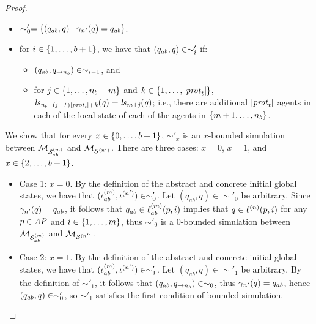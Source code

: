 \documentclass{article}
\begin{document}
\begin{proof}
\begin{itemize}

    \item  $\sim'_0 = \left \{ (q_{ab}, q) \mid  \gamma_{n'}(q) = q_{ab} \right \}$.


  \item for $i \in \left \{ 1, \ldots, b + 1 \right \}$, we have that $(q_{ab}, q) \in
  \sim'_i$ if:
  \begin{itemize}
    \item  $(q_{ab},q_{\rightarrow n_b}) \in \sim_{i-1}$, and 
    \item  for $j \in \left \{ 1,\ldots,n_b - m \right \}$ and $k \in \left \{ 1,\ldots,|\mathit{prot}_{t}| \right \}$, 
    $\it{ls}_{n_b + (j - 1) |\mathit{prot}_{t}| + k}(q) = \it{ls}_{m+j}(q)$; i.e., there are
          additional $|\mathit{prot}_{t}|$  agents in each of the local state of each of
          the agents in $\left \{ m+1,\ldots,n_b \right \}$.
  \end{itemize}
\end{itemize}

We show that for every $x \in \left \{ 0, \ldots, b+1 \right \}$, $\sim'_x$ is an
$x$-bounded simulation between $\mathcal{M}_{\mathcal{S}_{ab}^{(m)}}$ and $\mathcal{M}_{\mathcal{S}^{(n')}}$. There are three
cases: $x=0$, $x=1$, and $x \in \left \{ 2,\ldots,b+1 \right \}$.
    
\begin{itemize}
  \item Case 1: $x=0$. By the definition of the abstract and concrete initial
      global states, we have that $(\iota^{({m})}_{ab}, \iota^{({n'})}) \in
        \sim'_0$. Let $(q_{ab}, q) \in \sim'_0$ be arbitrary. Since
        $\gamma_{n'}(q) = q_{ab}$, it follows that $q_{ab} \in \ell^{(m)}_{ab}(p,
        i)$ implies that $q \in \ell^{(n)} (p, i)$ for any $p \in \it{AP}$
        and $i \in \left \{ 1,\ldots,m \right \}$, thus $\sim'_0$ is a $0$-bounded
        simulation between $\mathcal{M}_{\mathcal{S}_{ab}^{(m)}}$ and $\mathcal{M}_{\mathcal{S}^{(n')}}$.


  \item Case 2: $x = 1$.   By the definition of the abstract and concrete
      initial global states, we have that $(\iota^{({m})}_{ab}, \iota^{({n'})})
        \in \sim'_1$. Let $(q_{ab}, q) \in \sim'_1$ be arbitrary. By the
        definition of $\sim'_1$, it follows that $(q_{ab},
        q_{\rightarrow n_b}) \in \sim_{0}$, thus $\gamma_{n'}(q) = q_{ab}$,
        hence  $(q_{ab}, q) \in \sim'_0$, so $\sim'_1$ satisfies the first
        condition of bounded simulation. 



\end{itemize}
\end{proof}
\end{document}
